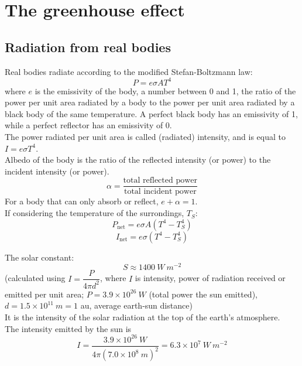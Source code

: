 \documentclass[a4paper,12pt]{article}
\begin{document}
\section{The greenhouse effect}
\subsection{Radiation from real bodies}
Real bodies radiate according to the modified Stefan-Boltzmann law:
\[P=e\sigma AT^4\]
where $e$ is the emissivity of the body, a number between 0 and 1, the ratio of the power per unit area radiated by a body to the power per unit area radiated by a black body of the same temperature. A perfect black body has an emissivity of 1, while a perfect reflector has an emissivity of 0.\\
The power radiated per unit area is called (radiated) intensity, and is equal to $I=e\sigma T^4$.\\
Albedo of the body is the ratio of the reflected intensity (or power) to the incident intensity (or power).
\[\alpha=\dfrac{\text{total reflected power}}{\text{total incident power}}\]
For a body that can only absorb or reflect, $e+\alpha=1$.\\
If considering the temperature of the surrondings, $T_S$:
\[P_\text{net}=e\sigma A(T^4-T_S^4)\]
\[I_\text{net}=e\sigma (T^4-T_S^4)\]
\begin{center}
\end{center}
The solar constant:
\[S\approx 1400\ W\ m^{-2}\]
(calculated using $I=\dfrac{P}{4\pi d^2}$, where $I$ is intensity, power of radiation received or emitted per unit area; $P=3.9\times 10^{26}\ W$ (total power the sun emitted), $d=1.5\times 10^{11}\ m=1$ au, average earth-sun distance)\\
It is the intensity of the solar radiation at the top of the earth's atmosphere.\\
The intensity emitted by the sun is
\[I=\dfrac{3.9\times 10^{26}\ W}{4\pi (7.0\times 10^8\ m)^2}=6.3\times 10^7\ W\ m^{-2}\]
\end{document}
